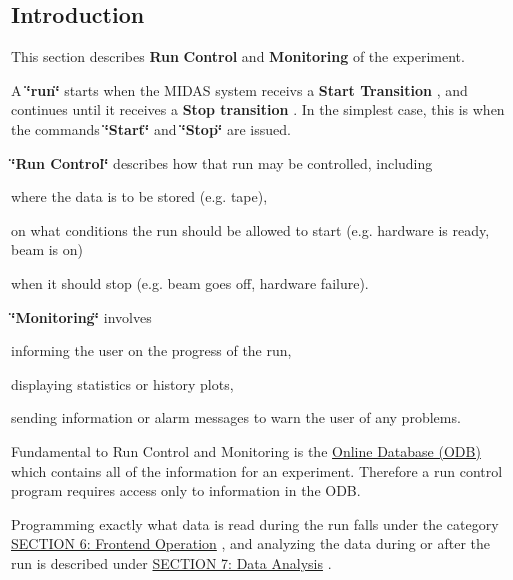 \par
  \par
\hypertarget{RunControl_RC_Intro}{}\subsection{Introduction}\label{RunControl_RC_Intro}
This section describes {\bfseries Run} {\bfseries Control} and {\bfseries Monitoring} of the experiment.

A {\bfseries \char`\"{}run\char`\"{}} starts when the MIDAS system receivs a {\bfseries  Start Transition }, and continues until it receives a {\bfseries  Stop transition }. In the simplest case, this is when the commands {\bfseries \char`\"{}Start\char`\"{}} and {\bfseries \char`\"{}Stop\char`\"{}} are issued.

{\bfseries  \char`\"{}Run Control\char`\"{} } describes how that run may be controlled, including
\begin{DoxyItemize}
\item where the data is to be stored (e.g. tape),
\item on what conditions the run should be allowed to start (e.g. hardware is ready, beam is on)
\item when it should stop (e.g. beam goes off, hardware failure).
\end{DoxyItemize}

{\bfseries  \char`\"{}Monitoring\char`\"{} } involves
\begin{DoxyItemize}
\item informing the user on the progress of the run,
\item displaying statistics or history plots,
\item sending information or alarm messages to warn the user of any problems.
\end{DoxyItemize}

\par
 Fundamental to Run Control and Monitoring is the \hyperlink{F_MainElements_F_Online_Database_overview}{Online Database (ODB)} which contains all of the information for an experiment. Therefore a run control program requires access only to information in the ODB.

\par
 Programming exactly what data is read during the run falls under the category \hyperlink{FrontendOperation}{SECTION 6: Frontend Operation} , and analyzing the data during or after the run is described under \hyperlink{DataAnalysis}{SECTION 7: Data Analysis} . \par



